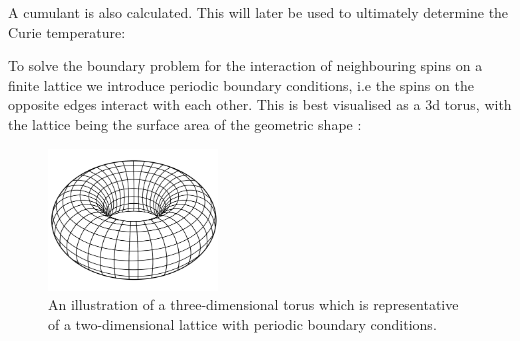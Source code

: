 A cumulant is also calculated. This will later be used to ultimately determine the Curie temperature:


To solve the boundary problem for the interaction of neighbouring spins on a finite lattice we introduce periodic boundary conditions, i.e the spins on the opposite edges interact with each other. This is best visualised as a 3d torus, with the lattice being the surface area of the geometric shape \cite{kotze}:

\begin{figure}[h!]
	\label{fig:torus}
	\includegraphics[width=0.4\textwidth]{figures/torus.png}
	\centering
	\caption{An illustration of a three-dimensional torus which is representative of
a two-dimensional lattice with periodic boundary conditions.}
\end{figure}
